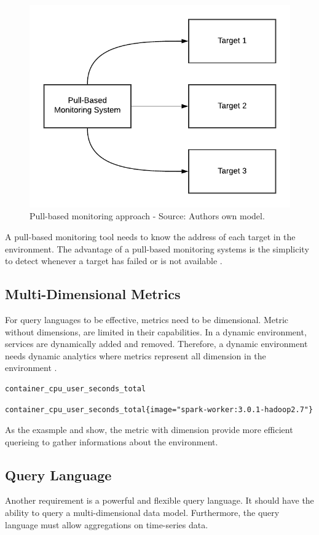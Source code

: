 \begin{figure}[h]
\centering
\includegraphics[scale=0.8]{images/02_theoretical_foundation/monitoring/pull_based}
\caption{Pull-based monitoring approach - Source: Authors own model.}
\label{fig:mon_pull-based}
\end{figure}
A pull-based monitoring tool needs to know the address of each target in the environment.
The advantage of a pull-based monitoring systems is the simplicity to detect whenever a target has failed or is not available \cite{Farcic2017Toolkit21}.


\subsection{Multi-Dimensional Metrics}
\label{subsec:02_monitoring_db_multi-metrics}
For query languages to be effective, metrics need to be dimensional. Metric without dimensions, are limited in their capabilities.
In a dynamic environment, services are dynamically added and removed. Therefore, a dynamic environment needs dynamic analytics where metrics represent all dimension in the environment \cite{Farcic2018Toolkit22}.
\begin{lstlisting}[frame=single, label=lst:mon_metr_dimless, caption=Example of a dimensionless-metric, captionpos=b]
container_cpu_user_seconds_total
\end{lstlisting}
\begin{lstlisting}[frame=single, label=lst:mon_metr_withdim, caption=Example of a metric with dimensions, captionpos=b]
container_cpu_user_seconds_total{image="spark-worker:3.0.1-hadoop2.7"}
\end{lstlisting}
As the exasmple  and  show, the metric with dimension provide more efficient querieing to gather informations about the environment.


\subsection{Query Language}
Another requirement is a powerful and flexible query language. It should have the ability to query a multi-dimensional data model.
Furthermore, the query language must allow aggregations on time-series data.
